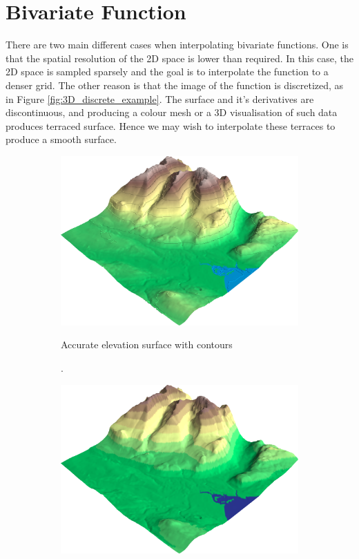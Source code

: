 \documentclass[a4paper,10pt]{report}
\begin{document}
\section{Bivariate Function}
There are two main different cases when interpolating bivariate functions. One is that the spatial resolution of the 2D space is lower than required. In this case, the 2D space is sampled sparsely and the goal is to interpolate the function to a denser grid. The other reason is that the image of the function is discretized, as in Figure \ref{fig:3D_discrete_example}. The surface and it's derivatives are discontinuous, and producing a colour mesh or a 3D visualisation of such data produces terraced surface. Hence we may wish to interpolate these terraces to produce a smooth surface.

\begin{figure}[H]
    \centering
    \begin{subfigure}{.3\textwidth}
        \includegraphics[width=1\textwidth]{../images/discretize/Accurate.png}
    \caption.{Accurate elevation surface with contours}
    \end{subfigure}
    \hfill
    \begin{subfigure}{.3\textwidth}
        \includegraphics[width=1\textwidth]{../images/discretize/Color_Graded.png}

\end{subfigure}
\end{figure}
\end{document}
